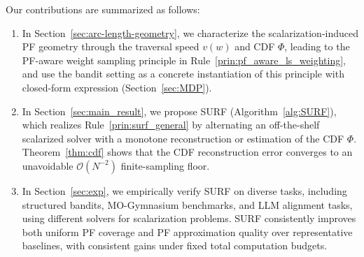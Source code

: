 \documentclass{article}
\newcommand{\Oc}{\mathcal{O}}
\newcommand{\Farc}{\Phi}
\begin{document}
Our contributions are summarized as follows:
\vspace{-0.2cm}
\begin{enumerate}[leftmargin=*, align=left]
\item[\textbf{C1) PF geometry characterization.}] In Section~\ref{sec:arc-length-geometry}, we characterize the scalarization-induced PF geometry through the traversal speed $v(w)$ and CDF $\Farc$, leading to the PF-aware weight sampling principle in Rule~\ref{prin:pf_aware_ls_weighting}, and use the bandit setting as a concrete instantiation of this principle with closed-form expression (Section~\ref{sec:MDP}).

\item[\textbf{C2) SURF algorithm with convergence guarantee.}] In Section~\ref{sec:main_result}, we propose SURF (Algorithm~\ref{alg:SURF}), which realizes Rule~\ref{prin:surf_general} by alternating an off-the-shelf scalarized solver with a monotone reconstruction or estimation of the CDF $\Farc$. Theorem~\ref{thm:cdf} shows that the CDF reconstruction error converges to an unavoidable $\Oc(N^{-2})$ finite-sampling floor.

\item[\textbf{C3) Empirical verification.}] In Section~\ref{sec:exp}, we empirically verify SURF on diverse tasks, including structured bandits, MO-Gymnasium benchmarks, and LLM alignment tasks, using different solvers for scalarization problems. 
SURF consistently improves both uniform PF coverage and PF approximation quality over representative baselines, with consistent gains under fixed total computation budgets.
\end{enumerate}

\vspace{-0.2cm}
\end{document}

